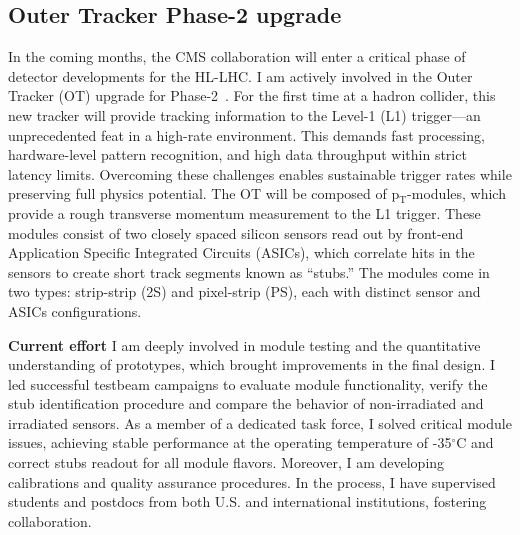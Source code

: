 {\begin{flushleft}
\subsection{Outer Tracker Phase-2 upgrade}
\vskip 4pt 
In the coming months, the CMS collaboration will enter a critical phase of detector developments for the HL-LHC. I am actively involved in the Outer Tracker (OT) upgrade for Phase-2~\cite{[7]}. For the first time at a hadron collider, this new tracker will provide tracking information to the Level-1 (L1) trigger—an unprecedented feat in a high-rate environment. This demands fast processing, hardware-level pattern recognition, and high data throughput within strict latency limits. Overcoming these challenges enables sustainable trigger rates while preserving full physics potential. %
The OT will be composed of p$_{\mathrm{T}}$-modules, which provide a rough transverse momentum measurement to the L1 trigger. These modules consist of two closely spaced silicon sensors read out by front-end Application Specific Integrated Circuits (ASICs), which correlate hits in the sensors to create short track segments known as ``stubs.'' The modules come in two types: strip-strip (2S) and pixel-strip (PS), each with distinct sensor and ASICs  configurations. %

\textbf{Current effort}
I am deeply involved in module testing and the quantitative understanding of prototypes, which brought improvements in the final design. I led successful testbeam campaigns to evaluate module functionality, verify the stub identification procedure and compare the behavior of non-irradiated and irradiated sensors. As a member of a dedicated task force, I solved critical module issues, achieving stable performance at the operating temperature of -35$^{\circ}$C and correct stubs readout for all module flavors. Moreover, I am developing calibrations and quality assurance procedures. In the process, I have supervised students and postdocs from both U.S. and international institutions, fostering collaboration.


\end{flushleft}}
